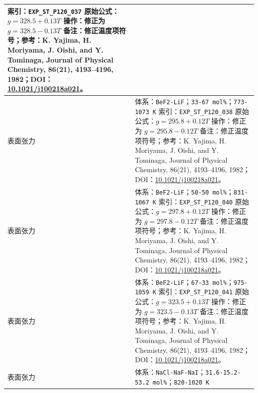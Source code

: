 \documentclass[12pt]{article}
\providecommand{\passthrough}[1]{#1}
\begin{document}
{\begin{longtable}[]{@{}
  >{\raggedright\arraybackslash}p{}
  >{\raggedright\arraybackslash}p{}@{}}
索引：\passthrough{\lstinline!EXP_ST_P120_037!}\newline
原始公式：\(g = 328.5 + 0.13 T\)\newline
操作：修正为 \(g = 328.5 - 0.13 T\)\newline
备注：修正温度项符号；参考：K. Yajima, H. Moriyama, J. Oishi, and Y. Tominaga, Journal of Physical Chemistry, 86(21), 4193--4196, 1982；DOI：\href{https://doi.org/10.1021/j100218a021}{10.1021/j100218a021}。 \\
\midrule
表面张力 & 体系：\passthrough{\lstinline!BeF2-LiF!}；\texttt{33-67 mol\%}；\passthrough{\lstinline!773-1073 K!}\newline
索引：\passthrough{\lstinline!EXP_ST_P120_038!}\newline
原始公式：\(g = 295.8 + 0.12 T\)\newline
操作：修正为 \(g = 295.8 - 0.12 T\)\newline
备注：修正温度项符号；参考：K. Yajima, H. Moriyama, J. Oishi, and Y. Tominaga, Journal of Physical Chemistry, 86(21), 4193--4196, 1982；DOI：\href{https://doi.org/10.1021/j100218a021}{10.1021/j100218a021}。 \\
\midrule
表面张力 & 体系：\passthrough{\lstinline!BeF2-LiF!}；\texttt{50-50 mol\%}；\passthrough{\lstinline!831-1067 K!}\newline
索引：\passthrough{\lstinline!EXP_ST_P120_040!}\newline
原始公式：\(g = 297.8 + 0.12 T\)\newline
操作：修正为 \(g = 297.8 - 0.12 T\)\newline
备注：修正温度项符号；参考：K. Yajima, H. Moriyama, J. Oishi, and Y. Tominaga, Journal of Physical Chemistry, 86(21), 4193--4196, 1982；DOI：\href{https://doi.org/10.1021/j100218a021}{10.1021/j100218a021}。 \\
\midrule
表面张力 & 体系：\passthrough{\lstinline!BeF2-LiF!}；\texttt{67-33 mol\%}；\passthrough{\lstinline!975-1059 K!}\newline
索引：\passthrough{\lstinline!EXP_ST_P120_041!}\newline
原始公式：\(g = 323.5 + 0.13 T\)\newline
操作：修正为 \(g = 323.5 - 0.13 T\)\newline
备注：修正温度项符号；参考：K. Yajima, H. Moriyama, J. Oishi, and Y. Tominaga, Journal of Physical Chemistry, 86(21), 4193--4196, 1982；DOI：\href{https://doi.org/10.1021/j100218a021}{10.1021/j100218a021}。 \\
\midrule
表面张力 & 体系：\passthrough{\lstinline!NaCl-NaF-NaI!}；\texttt{31.6-15.2-53.2 mol\%}；\passthrough{\lstinline!820-1020 K!}\newline

\end{longtable}}
\end{document}
